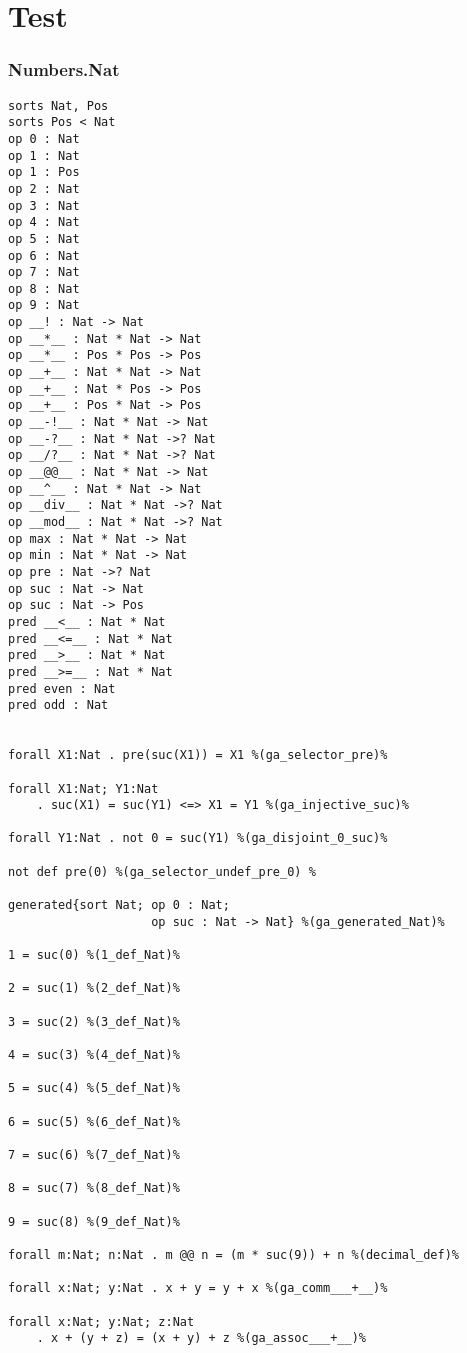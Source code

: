 \documentclass[11pt,a4paper]{article}
\begin{document}
\part*{Test}
\section*{Numbers.Nat}
\begin{verbatim}
sorts Nat, Pos
sorts Pos < Nat
op 0 : Nat
op 1 : Nat
op 1 : Pos
op 2 : Nat
op 3 : Nat
op 4 : Nat
op 5 : Nat
op 6 : Nat
op 7 : Nat
op 8 : Nat
op 9 : Nat
op __! : Nat -> Nat
op __*__ : Nat * Nat -> Nat
op __*__ : Pos * Pos -> Pos
op __+__ : Nat * Nat -> Nat
op __+__ : Nat * Pos -> Pos
op __+__ : Pos * Nat -> Pos
op __-!__ : Nat * Nat -> Nat
op __-?__ : Nat * Nat ->? Nat
op __/?__ : Nat * Nat ->? Nat
op __@@__ : Nat * Nat -> Nat
op __^__ : Nat * Nat -> Nat
op __div__ : Nat * Nat ->? Nat
op __mod__ : Nat * Nat ->? Nat
op max : Nat * Nat -> Nat
op min : Nat * Nat -> Nat
op pre : Nat ->? Nat
op suc : Nat -> Nat
op suc : Nat -> Pos
pred __<__ : Nat * Nat
pred __<=__ : Nat * Nat
pred __>__ : Nat * Nat
pred __>=__ : Nat * Nat
pred even : Nat
pred odd : Nat


forall X1:Nat . pre(suc(X1)) = X1 %(ga_selector_pre)%

forall X1:Nat; Y1:Nat
    . suc(X1) = suc(Y1) <=> X1 = Y1 %(ga_injective_suc)%

forall Y1:Nat . not 0 = suc(Y1) %(ga_disjoint_0_suc)%

not def pre(0) %(ga_selector_undef_pre_0) %

generated{sort Nat; op 0 : Nat;
                    op suc : Nat -> Nat} %(ga_generated_Nat)%

1 = suc(0) %(1_def_Nat)%

2 = suc(1) %(2_def_Nat)%

3 = suc(2) %(3_def_Nat)%

4 = suc(3) %(4_def_Nat)%

5 = suc(4) %(5_def_Nat)%

6 = suc(5) %(6_def_Nat)%

7 = suc(6) %(7_def_Nat)%

8 = suc(7) %(8_def_Nat)%

9 = suc(8) %(9_def_Nat)%

forall m:Nat; n:Nat . m @@ n = (m * suc(9)) + n %(decimal_def)%

forall x:Nat; y:Nat . x + y = y + x %(ga_comm___+__)%

forall x:Nat; y:Nat; z:Nat
    . x + (y + z) = (x + y) + z %(ga_assoc___+__)%


\end{verbatim}
\end{document}
